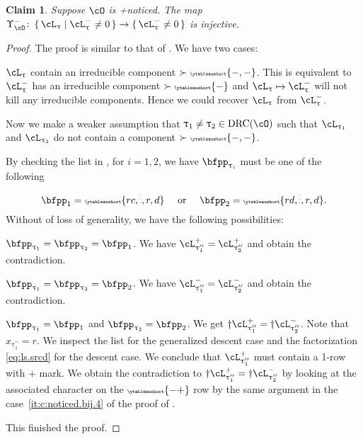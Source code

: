 \documentclass[12pt,a4paper]{amsart}
\numberwithin{equation}{section}
\newtheorem{claim}[thm]{Claim}
\theoremstyle{remark}
\def\ssign{\mathrm{Sign}}
\def\drc{\mathrm{DRC}}
\let\ytb=\ytableaushort
\newcommand{\tytb}[1]{{\tiny\ytb{#1}}}
\def\nUpsilon{\Upsilon^-}
\def\pcL{\cL^+}
\def\ncL{\cL^-}
\def\uptaupp{\uptau^{\prime\prime}}
\begin{document}
\begin{claim}\label{c:gd.pnoticed.n}
    Suppose $\cO$ is +noticed.
    The map $\nUpsilon_{\cO}\colon \set{\cL_{\uptau}|\ncL_{\uptau}\neq 0}\rightarrow \set{\ncL_{\uptau}\neq 0}$
    is injective.
\end{claim}
\begin{proof}
  The proof is similar to that of .
    We have two cases:
    \begin{enumPF}
      \item $\cL_{\uptau}$ contain an irreducible component $\succ \tytb{-,-}$.
      This is equivalent to $\ncL_{\uptau}$ has an irreducible component
      $\succ\tytb{-}$ and $\cL_{\uptau}\mapsto \ncL_{\uptau}$ will
      not kill any irreducible components. Hence we could recover $\cL_{\uptau}$
      from $\ncL_{\uptau}$.%

      \item Now we make a weaker assumption that $\uptau_{1}\neq \uptau_{2}\in \drc(\cO)$ such that
      $\cL_{\uptau_{1}}$ and $\cL_{\uptau_{2}}$ do not contain a component
      $\succ \tytb{-,-}$.

      By checking the list in , for $i=1,2$, we
      have $\bfpp_{\uptau_{i}}$ must be one of the following
      \[
        \bfpp_{1}=  \tytb{rc,\vdots,r,d} \quad \text{ or } \quad \bfpp_{2}= \tytb{rd,\vdots,r,d}.
      \]
      Without of loss of generality, we have the following possibilities:
      \begin{enumPF}
        \item $\bfpp_{\uptau_{1}}=\bfpp_{\uptau_{2}}=\bfpp_{1}$. We have
        $\pcL_{\uptaupp_{1}}=\pcL_{\uptaupp_{2}}$ and obtain the contradiction.
        \item $\bfpp_{\uptau_{1}}=\bfpp_{\uptau_{2}}=\bfpp_{2}$. We have
        $\ncL_{\uptaupp_{1}}=\ncL_{\uptaupp_{2}}$ and obtain the contradiction.
        \item $\bfpp_{\uptau_{1}}=\bfpp_{1}$ and $\bfpp_{\uptau_{2}}=\bfpp_{2}$.
        We get $\dagger\pcL_{\uptaupp_{1}}=\dagger \ncL_{\uptaupp_{2}}$.
        Note that $x_{\uptaupp_{1}}=r$.
        We inspect the list  for the generalized descent case and
        the factorization \eqref{eq:ls.srcd} for the descent case. We conclude
        that $\pcL_{\uptaupp_{1}}$ must contain a 1-row with
        $+$ mark. We obtain the contradiction to
        $\dagger \pcL_{\uptaupp_{1}}=\dagger\ncL_{\uptaupp_{2}}$
        by looking at the associated
        character on the $\tytb{-+}$ row by the same argument in the
        case~\ref{it:c:noticed.bij.4} of the proof of .
      \end{enumPF}
    \end{enumPF}
    This finished the proof.
\end{proof}
\end{document}
